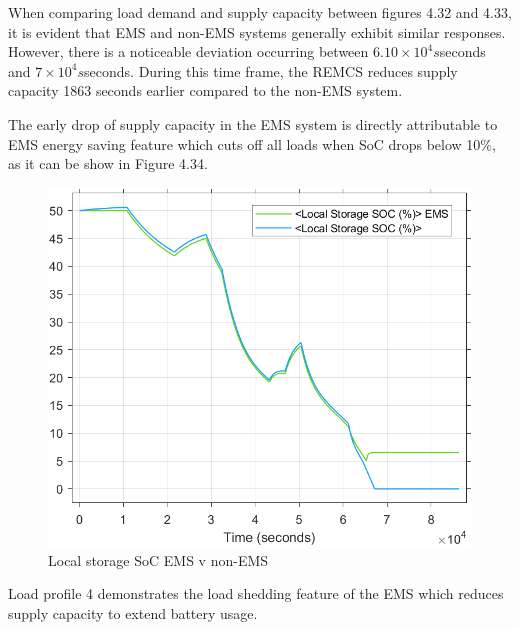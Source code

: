 When comparing load demand and supply capacity between figures 4.32 and 4.33, it is evident that EMS and non-EMS systems generally exhibit similar responses. However, there is a noticeable deviation occurring between ${6.10\times10^4 s}$seconds and ${7\times10^4 s}$seconds. During this time frame, the REMCS reduces supply capacity 1863 seconds earlier compared to the non-EMS system.\par

The early drop of supply capacity in the EMS system is directly attributable to EMS energy saving feature which cuts off all loads when SoC drops below 10\%, as it can be show in Figure 4.34.\par

\begin{figure}[H]
	\centering
	\includegraphics[totalheight=8cm]{Figures/local storage soc ems v non-ems1.png}
	\caption{Local storage SoC EMS v non-EMS}
\end{figure}
Load profile 4 demonstrates the load shedding feature of the EMS which reduces supply capacity to extend battery usage.\par
